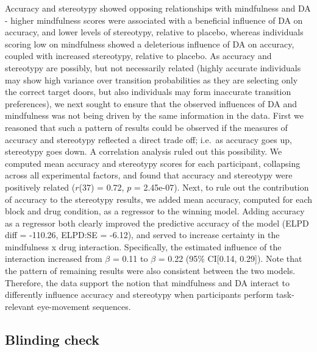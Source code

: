 \documentclass{article}
\begin{document}
Accuracy and stereotypy showed opposing relationships with mindfulness
and DA - higher mindfulness scores were associated with a beneficial
influence of DA on accuracy, and lower levels of stereotypy, relative to
placebo, whereas individuals scoring low on mindfulness showed a
deleterious influence of DA on accuracy, coupled with increased
stereotypy, relative to placebo. As accuracy and stereotypy are
possibly, but not necessarily related (highly accurate individuals may
show high variance over transition probabilities as they are selecting
only the correct target doors, but also individuals may form inaccurate
transition preferences), we next sought to ensure that the observed
influences of DA and mindfulness was not being driven by the same
information in the data. First we reasoned that such a pattern of
results could be observed if the measures of accuracy and stereotypy
reflected a direct trade off; i.e.~as accuracy goes up, stereotypy goes
down. A correlation analysis ruled out this possibility. We computed
mean accuracy and stereotypy scores for each participant, collapsing
across all experimental factors, and found that accuracy and stereotypy
were positively related (\(r\)(37) = 0.72, \(p\) = 2.45e-07). Next, to
rule out the contribution of accuracy to the stereotypy results, we
added mean accuracy, computed for each block and drug condition, as a
regressor to the winning model. Adding accuracy as a regressor both
clearly improved the predictive accuracy of the model (ELPD diff =
-110.26, ELPD:SE = -6.12), and served to increase certainty in the
mindfulness x drug interaction. Specifically, the estimated influence of
the interaction increased from \(\beta\) = 0.11 to \(\beta\) = 0.22
(95\% CI{[}0.14, 0.29{]}). Note that the pattern of remaining results
were also consistent between the two models. Therefore, the data support
the notion that mindfulness and DA interact to differently influence
accuracy and stereotypy when participants perform task-relevant
eye-movement sequences.

\hypertarget{blinding-check}{%
\subsection{Blinding check}\label{blinding-check}}
\end{document}
